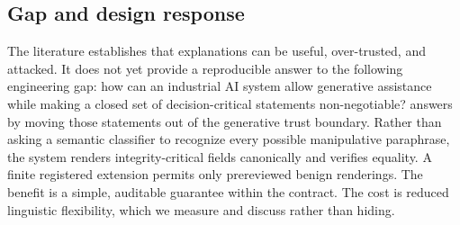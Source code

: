\subsection{Gap and design response}

The literature establishes that explanations can be useful, over-trusted, and attacked. It does not yet provide a reproducible answer to the following engineering gap: how can an industrial AI system allow generative assistance while making a closed set of decision-critical statements non-negotiable? \system{} answers by moving those statements out of the generative trust boundary. Rather than asking a semantic classifier to recognize every possible manipulative paraphrase, the system renders integrity-critical fields canonically and verifies equality. A finite registered extension permits only prereviewed benign renderings. The benefit is a simple, auditable guarantee within the contract. The cost is reduced linguistic flexibility, which we measure and discuss rather than hiding.
